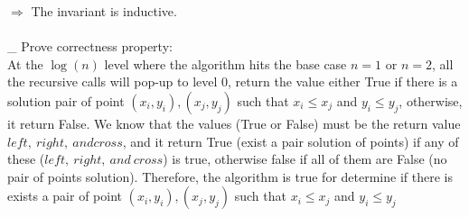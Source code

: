 \documentclass[11pt]{article}
\newcommand{\tab}{\hspace*{2em}}
\begin{document}
$\Rightarrow$ The invariant is inductive.\\
\\
\_ Prove correctness property:\\
\tab At the $\log(n)$ level where the algorithm hits the base case $n = 1$ or $n = 2$, all the recursive calls will pop-up to level 0, return the value either True if there is a solution pair of point $(x_i,y_i),(x_j,y_j)$ such that $x_i \leqslant x_j$ and $y_i\leqslant y_j$, otherwise, it return False. We know that the values (True or False) must be the return value $left,\ right,\ and cross$, and it return True (exist a pair solution of points) if any of these ($left,\ right,\ and\ cross$) is true, otherwise false if all of them are False (no pair of points solution). Therefore, the algorithm is true for determine if there is exists a pair of point $(x_i,y_i),(x_j,y_j)$ such that $x_i \leqslant x_j$ and $y_i\leqslant y_j$

\newpage
\end{document}
